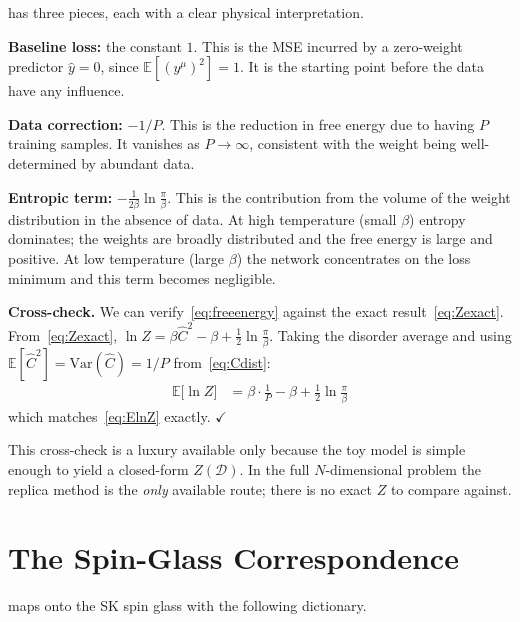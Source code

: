\documentclass[nobib,justified]{tufte-handout}
\newcommand{\EE}{\mathbb{E}}
\newcommand{\cD}{\mathcal{D}}
\begin{document}
 has three pieces,
each with a clear physical interpretation.

\medskip
\noindent\textbf{Baseline loss:} the constant $1$.  This is the MSE
incurred by a zero-weight predictor $\hat{y}=0$, since
$\EE[(y^\mu)^2]=1$.  It is the starting point before the data
have any influence.

\medskip
\noindent\textbf{Data correction:} $-1/P$.  This is the reduction in
free energy due to having $P$ training samples.  It vanishes as
$P\to\infty$, consistent with the weight being well-determined by
abundant data.

\medskip
\noindent\textbf{Entropic term:} $-\frac{1}{2\beta}\ln\frac{\pi}{\beta}$.
This is the contribution from the volume of the weight distribution in
the absence of data.  At high temperature (small $\beta$) entropy
dominates; the weights are broadly distributed and the free energy is
large and positive.  At low temperature (large $\beta$) the network
concentrates on the loss minimum and this term becomes negligible.

\medskip
\noindent\textbf{Cross-check.}  We can verify~\eqref{eq:freeenergy}
against the exact result~\eqref{eq:Zexact}.  From~\eqref{eq:Zexact},
$\ln Z = \beta\hat{C}^2 - \beta + \frac{1}{2}\ln\frac{\pi}{\beta}$.
Taking the disorder average and using
$\EE[\hat{C}^2]=\mathrm{Var}(\hat{C})=1/P$ from~\eqref{eq:Cdist}:
\begin{align}
  \EE\bigl[\ln Z\bigr]
  &= \beta\cdot\frac{1}{P} - \beta + \frac{1}{2}\ln\frac{\pi}{\beta}
  \label{eq:check}
\end{align}
which matches~\eqref{eq:ElnZ} exactly. $\checkmark$

\medskip
This cross-check is a luxury available only because the toy model is
simple enough to yield a closed-form $Z(\cD)$.  In the full
$N$-dimensional problem the replica method is the \emph{only} available
route; there is no exact $Z$ to compare against.

\section{The Spin-Glass Correspondence}

 maps onto the SK spin glass with the
following dictionary.
\end{document}
